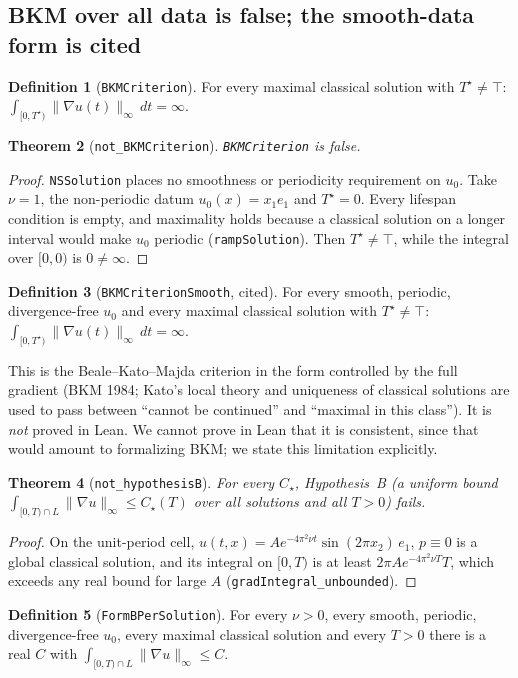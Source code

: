 \documentclass[11pt]{article}
\newtheorem{theorem}{Theorem}
\theoremstyle{definition}
\newtheorem{definition}[theorem]{Definition}
\newcommand{\Tstar}{T^\star}
\newcommand{\lean}[1]{\texttt{#1}}
\begin{document}
\subsection{BKM over all data is false; the smooth-data form is cited}
\begin{definition}[\lean{BKMCriterion}]
For every maximal classical solution with $\Tstar\neq\top$:
$\int_{[0,\Tstar)}\|\nabla u(t)\|_\infty\,dt = \infty$.
\end{definition}
\begin{theorem}[\lean{not\_BKMCriterion}]
\lean{BKMCriterion} is false.
\end{theorem}
\begin{proof}
\lean{NSSolution} places no smoothness or periodicity requirement on $u_0$. Take $\nu=1$,
the non-periodic datum $u_0(x)=x_1e_1$ and $\Tstar=0$. Every lifespan condition is empty,
and maximality holds because a classical solution on a longer interval would make $u_0$
periodic (\lean{rampSolution}). Then $\Tstar\ne\top$, while the integral over $[0,0)$ is
$0\ne\infty$.
\end{proof}
\begin{definition}[\lean{BKMCriterionSmooth}, cited]
For every smooth, periodic, divergence-free $u_0$ and every maximal classical solution
with $\Tstar\neq\top$: $\int_{[0,\Tstar)}\|\nabla u(t)\|_\infty\,dt = \infty$.
\end{definition}
This is the Beale--Kato--Majda criterion in the form controlled by the full gradient
(BKM 1984; Kato's local theory and uniqueness of classical solutions are used to pass
between ``cannot be continued'' and ``maximal in this class''). It is \emph{not}
proved in Lean. We cannot prove in Lean that it is consistent, since that would amount
to formalizing BKM; we state this limitation explicitly.

\begin{theorem}[\lean{not\_hypothesisB}]
For every $C_\star$, Hypothesis~B (a uniform bound
$\int_{[0,T)\cap L}\|\nabla u\|_\infty\le C_\star(T)$ over all solutions and all $T>0$)
fails.
\end{theorem}
\begin{proof}
On the unit-period cell, $u(t,x)=A e^{-4\pi^2\nu t}\sin(2\pi x_2)\,e_1$, $p\equiv 0$ is a
global classical solution, and its integral on $[0,T)$ is at least
$2\pi A e^{-4\pi^2\nu T}T$, which exceeds any real bound for large $A$
(\lean{gradIntegral\_unbounded}).
\end{proof}
\begin{definition}[\lean{FormBPerSolution}]
For every $\nu>0$, every smooth, periodic, divergence-free $u_0$, every maximal classical
solution and every $T>0$ there is a real $C$ with
$\int_{[0,T)\cap L}\|\nabla u\|_\infty\le C$.
\end{definition}
\end{document}
